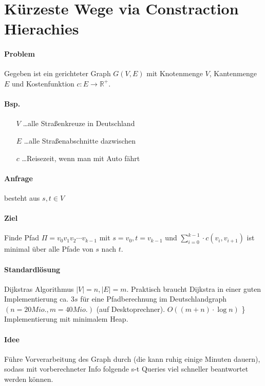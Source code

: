 \section{Kürzeste Wege via Constraction Hierachies}

\paragraph*{Problem} Gegeben ist ein gerichteter Graph $G(V,E)$ mit Knotenmenge $V$, Kantenmenge $E$ und Kostenfunktion $c:E \rightarrow \mathbb{R}^+$.

\paragraph*{Bsp.}
\begin{itemize}
	\item[$V$] \dots alle Straßenkreuze in Deutschland
	\item[$E$] \dots alle Straßenabschnitte dazwischen
	\item[$c$] \dots Reisezeit, wenn man mit Auto fährt
\end{itemize}

\paragraph*{Anfrage} besteht aus $s,t \in V$

\paragraph*{Ziel} Finde Pfad $\Pi = v_0v_1v_2 \cdots v_{k-1}$ mit $s=v_0, t=v_{k-1}$ und $\sum\limits_{i=0}^{k-1} \cdot c(v_i,v_{i+1})$ ist minimal über alle Pfade von $s$ nach $t$.

\paragraph*{Standardlösung} Dijkstras Algorithmus $|V|=n,|E|=m$. Praktisch braucht Dijkstra in einer guten Implementierung ca. $3s$ für eine Pfadberechnung im Deutschlandgraph $(n=20 Mio., m= 40 Mio.)$ (auf Desktoprechner). $O((m+n) \cdot \log n)$ \} Implementierung mit minimalem Heap.

\paragraph*{Idee} Führe Vorverarbeitung des Graph durch (die kann ruhig einige Minuten dauern), sodass mit vorberechneter Info folgende s-t Queries viel schneller beantwortet werden können.

